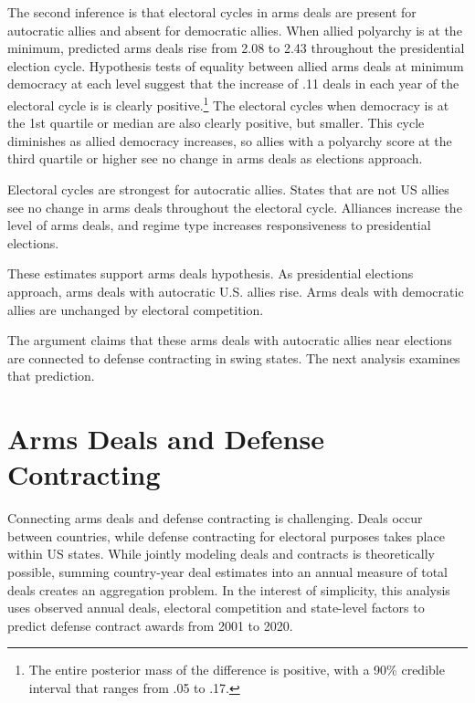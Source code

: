 \documentclass[12pt]{article}
\begin{document}
The second inference is that electoral cycles in arms deals are present for autocratic allies and absent for democratic allies.
When allied polyarchy is at the minimum, predicted arms deals rise from 2.08 to 2.43 throughout the presidential election cycle.
Hypothesis tests of equality between allied arms deals at minimum democracy at each level suggest that the increase of .11 deals in each year of the electoral cycle is is clearly positive.\footnote{The entire posterior mass of the difference is positive, with a 90\% credible interval that ranges from .05 to .17.}
The electoral cycles when democracy is at the 1st quartile or median are also clearly positive, but smaller.
This cycle diminishes as allied democracy increases, so allies with a polyarchy score at the third quartile or higher see no change in arms deals as elections approach.  


Electoral cycles are strongest for autocratic allies. 
States that are not US allies see no change in arms deals throughout the electoral cycle. 
Alliances increase the level of arms deals, and regime type increases responsiveness to presidential elections. 


These estimates support arms deals hypothesis. 
As presidential elections approach, arms deals with autocratic U.S. allies rise. 
Arms deals with democratic allies are unchanged by electoral competition.


The argument claims that these arms deals with autocratic allies near elections are connected to defense contracting in swing states. 
The next analysis examines that prediction. 


\section{Arms Deals and Defense Contracting}


Connecting arms deals and defense contracting is challenging. 
Deals occur between countries, while defense contracting for electoral purposes takes place within US states.
While jointly modeling deals and contracts is theoretically possible, summing country-year deal estimates into an annual measure of total deals creates an aggregation problem. %
In the interest of simplicity, this analysis uses observed annual deals, electoral competition and state-level factors to predict defense contract awards from 2001 to 2020. 
\end{document}
